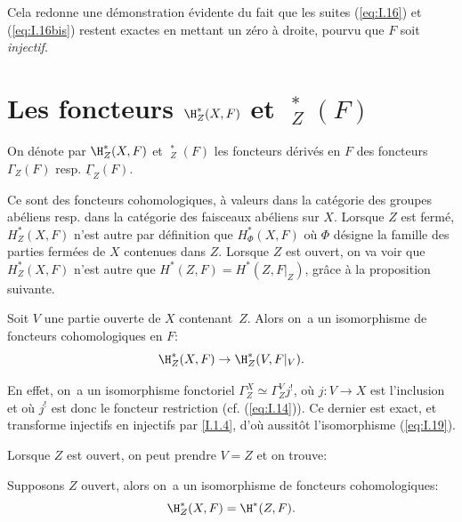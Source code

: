 Cela redonne une d\'emonstration \'evidente du fait que les suites (\ref{eq:I.16}) et (\ref{eq:I.16bis}) restent exactes en mettant un z\'ero \`a droite, pourvu que $F$ soit \textit{injectif}.

\section{Les foncteurs $\H_Z^*(X, F)$ et $\mathop{\underline{\mathrm{H}}}\nolimits_Z^*(F)$} \label{I.2}

\ignorespaces

\begin{definition} \label{I.2.1}
On d\'enote par $\H_Z^*(X, F)$ et ${\mathop{\underline{\mathrm{H}}}\nolimits}_Z^*(F)$ les foncteurs d\'eriv\'es en $F$ des foncteurs $\Gamma_Z(F)$ resp. $\underline{\Gamma}_Z(F)$.
\end{definition}

Ce sont des foncteurs cohomologiques, \`a valeurs dans la cat\'egorie des groupes ab\'eliens resp. dans la cat\'egorie des faisceaux ab\'eliens sur $X$. Lorsque $Z$ est ferm\'e, $H_Z^*(X, F)$ n'est autre par d\'efinition que $H^*_{\Phi}(X, F)$ o\`u $\Phi$ d\'esigne la famille des parties ferm\'ees de $X$ contenues dans $Z$. Lorsque $Z$ est ouvert, on va voir que $H_Z^*(X, F)$ n'est autre que $H^*(Z, F)=H^*(Z, F|_{Z})$, gr\^ace \`a la proposition suivante.

\begin{proposition} \label{I.2.2}
Soit $V$ une partie ouverte de $X$ contenant~$Z$. Alors on~a un isomorphisme de foncteurs cohomologiques en $F$:
\begin{equation} \label{eq:I.19}
\H^*_Z(X, F) \to \H^*_Z(V, F|_{V}).
\end{equation}
\end{proposition}

En effet, on~a un isomorphisme fonctoriel $\Gamma_Z^X \simeq \Gamma_Z^V j^!$, o\`u $j: V \to X$ est l'inclusion et o\`u $j^!$ est donc le foncteur restriction (cf. (\ref{eq:I.14})). Ce dernier est exact, et transforme injectifs en injectifs par \ref{I.1.4}, d'o\`u aussit\^{o}t l'isomorphisme (\ref{eq:I.19}).

Lorsque $Z$ est ouvert, on peut prendre $V=Z$ et on trouve:

\begin{corollaire} \label{I.2.3bof}
Supposons $Z$ ouvert, alors on~a un isomorphisme de foncteurs cohomologiques:
\begin{equation} \label{eq:I.20}
\H_Z^*(X, F) = \H^*(Z, F).
\end{equation}
\end{corollaire}

